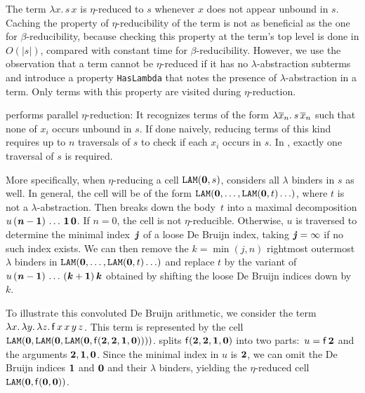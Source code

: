 The term $\lambda x.\, s \, x$ is $\eta$-reduced to $s$ whenever $x$ does not appear
unbound in $s$. Caching the property of $\eta$-reducibility of the term is not
as beneficial as the one for $\beta$-reducibility, because checking this
property at the term's top level is done in $O(|s|)$, compared with constant time
for $\beta$-reducibility.
However, we use the observation that a term cannot be $\eta$-reduced if it has
no $\lambda$-abstraction subterms and introduce a property \texttt{HasLambda}
that notes the presence of $\lambda$-abstraction in a term. Only
terms with this property are visited during $\eta$-reduction.

\ehohii{} performs parallel $\eta$-reduction: It recognizes terms of the form
$\lambda \overline{x}_n.\> s \, \overline{x}_n  $ such that none of $x_i$
occurs unbound in $s$. If done naively, reducing terms of this kind requires up to $n$
traversals of $s$ to check if each $x_i$ occurs in $s$. In \ehohii{}, exactly one
traversal of $s$ is required.

More specifically, when $\eta$-reducing a cell $\texttt{LAM}(\mathbf{0}, s)$,
\ehohii{} considers all $\lambda$ binders in $s$ as well. In general,
the cell will be of the form
$\texttt{LAM}(\mathbf{0}, \dotsc,\allowbreak \texttt{LAM}(\mathbf{0}, t) \ldots)$,
where $t$ is not a
$\lambda$-abstraction. Then \ehohii{} breaks down the body~$t$ into a maximal
decomposition $u\, (\textbf{\textit{n}}\mathbf{{}-1}) \, \ldots \, \mathbf{1} \, \mathbf{0}$.
If $n = 0$, the cell is not $\eta$-reducible.
Otherwise, $u$ is traversed to determine the
minimal index~$\textbf{\textit{j}}$ of a loose De Bruijn index,
taking $\textbf{\textit{j}} = \infty$ if no such index exists.
We can then remove the $k = \min(j,n)$ rightmost outermost $\lambda$ binders in $\texttt{LAM}(\mathbf{0},
\ldots, \texttt{LAM}(\mathbf{0}, t) \ldots)$ and replace %
$t$ by the variant of
$u \allowbreak\, (\textbf{\textit{n}}\mathbf{{}-1}) \allowbreak\, \ldots \, (\textbf{\textit{k}}\mathbf{{}+1}) \, \textbf{\textit{k}}$
obtained by shifting the loose De Bruijn indices down by~$k$.

To illustrate this convoluted De Bruijn arithmetic, we consider the
term $\lambda x. \, \lambda y. \, \lambda z.\, \mathsf{f} \, x \, x \, y
\, z$. This term is represented by the cell $\texttt{LAM}(\mathbf{0},
\texttt{LAM}(\mathbf{0}, \texttt{LAM}(\mathbf{0},\allowbreak \mathsf{f}(\mathbf{2}, \mathbf{2}, \mathbf{1},
\mathbf{0}))))$. \ehohii{} splits $\mathsf{f}(\mathbf{2}, \mathbf{2}, \mathbf{1}, \mathbf{0})$ into
two parts:\ $u = \mathsf{f} \, \mathbf{2}$ and the arguments $\mathbf{2}, \mathbf{1},
\mathbf{0}$. Since the minimal index in $u$ is $\mathbf{2}$, we can
omit the De Bruijn indices $\mathbf{1}$ and $\mathbf{0}$ and their $\lambda$ binders,
yielding the $\eta$-reduced cell $\texttt{LAM}(\mathbf{0}, \mathsf{f}(\mathbf{0},
\mathbf{0}))$.

